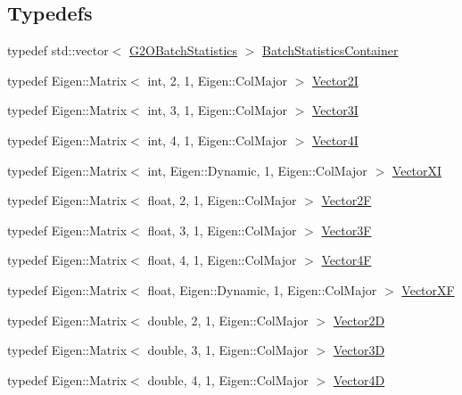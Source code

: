 \subsection*{Typedefs}
\begin{DoxyCompactItemize}
\item 
typedef std\+::vector$<$ \mbox{\hyperlink{structg2o_1_1_g2_o_batch_statistics}{G2\+O\+Batch\+Statistics}} $>$ \mbox{\hyperlink{namespaceg2o_a526b32fde21f83173acb2bb29db68275}{Batch\+Statistics\+Container}}
\item 
typedef Eigen\+::\+Matrix$<$ int, 2, 1, Eigen\+::\+Col\+Major $>$ \mbox{\hyperlink{namespaceg2o_affca5cbeca977d670b96298de84c5d2c}{Vector2I}}
\item 
typedef Eigen\+::\+Matrix$<$ int, 3, 1, Eigen\+::\+Col\+Major $>$ \mbox{\hyperlink{namespaceg2o_a501b6f80eef8d521f6fd1a31e8413f3a}{Vector3I}}
\item 
typedef Eigen\+::\+Matrix$<$ int, 4, 1, Eigen\+::\+Col\+Major $>$ \mbox{\hyperlink{namespaceg2o_a7a368c33c15d52cca214b779a5fb32ce}{Vector4I}}
\item 
typedef Eigen\+::\+Matrix$<$ int, Eigen\+::\+Dynamic, 1, Eigen\+::\+Col\+Major $>$ \mbox{\hyperlink{namespaceg2o_a2797ddaf7a7a6dc22843a38d34754e55}{Vector\+XI}}
\item 
typedef Eigen\+::\+Matrix$<$ float, 2, 1, Eigen\+::\+Col\+Major $>$ \mbox{\hyperlink{namespaceg2o_ab48f53e68ad9d381fcad63c4901af2e2}{Vector2F}}
\item 
typedef Eigen\+::\+Matrix$<$ float, 3, 1, Eigen\+::\+Col\+Major $>$ \mbox{\hyperlink{namespaceg2o_a0c03efd6b49abac71bfb012cc3237288}{Vector3F}}
\item 
typedef Eigen\+::\+Matrix$<$ float, 4, 1, Eigen\+::\+Col\+Major $>$ \mbox{\hyperlink{namespaceg2o_aebecb51a41734608aeea377a31ee88c6}{Vector4F}}
\item 
typedef Eigen\+::\+Matrix$<$ float, Eigen\+::\+Dynamic, 1, Eigen\+::\+Col\+Major $>$ \mbox{\hyperlink{namespaceg2o_a79143ea34679a74ee7ab02342b3a21df}{Vector\+XF}}
\item 
typedef Eigen\+::\+Matrix$<$ double, 2, 1, Eigen\+::\+Col\+Major $>$ \mbox{\hyperlink{namespaceg2o_a98731c1a538fbbbb105bc81434ebdecb}{Vector2D}}
\item 
typedef Eigen\+::\+Matrix$<$ double, 3, 1, Eigen\+::\+Col\+Major $>$ \mbox{\hyperlink{namespaceg2o_a944c2b1b0f84d33a7b297a4a585bf319}{Vector3D}}
\item 
typedef Eigen\+::\+Matrix$<$ double, 4, 1, Eigen\+::\+Col\+Major $>$ \mbox{\hyperlink{namespaceg2o_afd9c8c912186d1f96141027c854fce42}{Vector4D}}

\end{DoxyCompactItemize}
